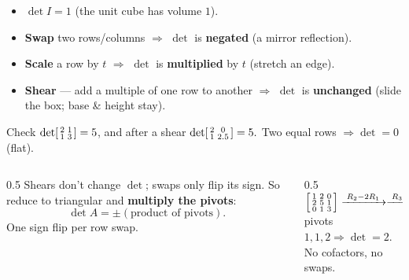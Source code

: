 \documentclass[aspectratio=169, 11pt]{beamer}
\begin{document}
\begin{frame}[t, plain]
  \begin{itemize}
    \setlength{\itemsep}{5pt}
    \item $\det I = 1$ \; (the unit cube has volume $1$).
    \item \textbf{Swap} two rows/columns $\Rightarrow$ $\det$ is \textbf{negated} (a mirror reflection).
    \item \textbf{Scale} a row by $t$ $\Rightarrow$ $\det$ is \textbf{multiplied} by $t$ (stretch an edge).
    \item \textbf{Shear} --- add a multiple of one row to another $\Rightarrow$ $\det$ is \textbf{unchanged}
          (slide the box; base \& height stay).
  \end{itemize}
  \vspace{2pt}
  \begin{block}{Check}
    $\det\begin{bsmallmatrix} 2 & 1\\ 1 & 3 \end{bsmallmatrix}=5$, and after a shear
    $\det\begin{bsmallmatrix} 2 & 0\\ 1 & 2.5 \end{bsmallmatrix}=5.$ \; Two equal rows $\Rightarrow\det=0$ (flat).
  \end{block}
\end{frame}

\begin{frame}[t, plain]
  \begin{columns}[T]
    \begin{column}{0.5\textwidth}
      Shears don't change $\det$; swaps only flip its sign. So reduce to triangular and
      \textbf{multiply the pivots}:
      \[ \det A = \pm(\text{product of pivots}). \]
      One sign flip per row swap.
    \end{column}
    \begin{column}{0.5\textwidth}
      \centering
      $\begin{bsmallmatrix} 1 & 2 & 0\\ 2 & 5 & 1\\ 0 & 1 & 3 \end{bsmallmatrix}
       \xrightarrow{\;R_2-2R_1\;}\xrightarrow{\;R_3-R_2\;}
       \begin{bsmallmatrix} 1 & 2 & 0\\ 0 & 1 & 1\\ 0 & 0 & 2 \end{bsmallmatrix}$\\[8pt]
      pivots $1,1,2 \Rightarrow \det = 2.$\\[4pt]
      {\scriptsize No cofactors, no swaps.}
    \end{column}
  \end{columns}
\end{frame}
\end{document}
